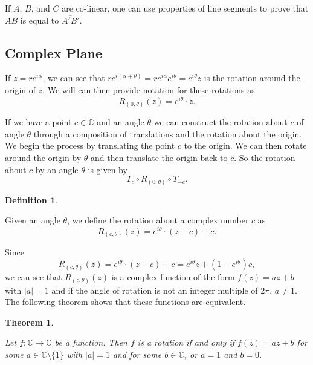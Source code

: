 \documentclass[
]{book}
\newtheorem{theorem}{Theorem}[chapter]
\theoremstyle{definition}
\newtheorem{definition}{Definition}[chapter]
\theoremstyle{definition}
\theoremstyle{definition}
\theoremstyle{definition}
\theoremstyle{remark}
\begin{document}
If \(A\), \(B\), and \(C\) are co-linear, one can use properties of line segments to prove that \(\overline{AB}\) is equal to \(\overline{A'B'}\).

\hypertarget{complex-plane-2}{%
\subsection{Complex Plane}\label{complex-plane-2}}

If \(z=re^{i\alpha}\), we can see that \(re^{i(\alpha+\theta)}= r e^{i\alpha} e^{i\theta} = e^{i\theta} z\) is the rotation around the origin of \(z\). We will can then provide notation for these rotations as
\[R_{(0,\theta)}(z) = e^{i\theta} \cdot z.\]

If we have a point \(c\in \mathbb{C}\) and an angle \(\theta\) we can construct the rotation about \(c\) of angle \(\theta\) through a composition of translations and the rotation about the origin. We begin the process by translating the point \(c\) to the origin. We can then rotate around the origin by \(\theta\) and then translate the origin back to \(c\). So the rotation about \(c\) by an angle \(\theta\) is given by \[T_c \circ R_{(0,\theta)} \circ T_{-c}.\]

\begin{definition}
\protect\hypertarget{def:unlabeled-div-267}{}\label{def:unlabeled-div-267}

Given an angle \(\theta\), we define the rotation about a complex number \(c\) as \[R_{(c,\theta)}(z) = e^{i\theta} \cdot (z-c)+c.\]

\end{definition}

Since \[R_{(c,\theta)}(z) = e^{i\theta} \cdot (z-c)+c = e^{i \theta} z + \left(1-e^{i\theta}\right)c,\] we can see that \(R_{(c,\theta)}(z)\) is a complex function of the form \(f(z)=az+b\) with \(|a|=1\) and if the angle of rotation is not an integer multiple of \(2\pi\), \(a\neq 1\). The following theorem shows that these functions are equivalent.

\begin{theorem}
\protect\hypertarget{thm:unlabeled-div-268}{}\label{thm:unlabeled-div-268}

Let \(f:\mathbb{C}\rightarrow \mathbb{C}\) be a function. Then \(f\) is a rotation if and only if \(f(z)=az+b\) for some \(a\in \mathbb{C}\setminus \{1\}\) with \(|a|=1\) and for some \(b\in \mathbb{C}\), or \(a=1\) and \(b=0\).

\end{theorem}
\end{document}
